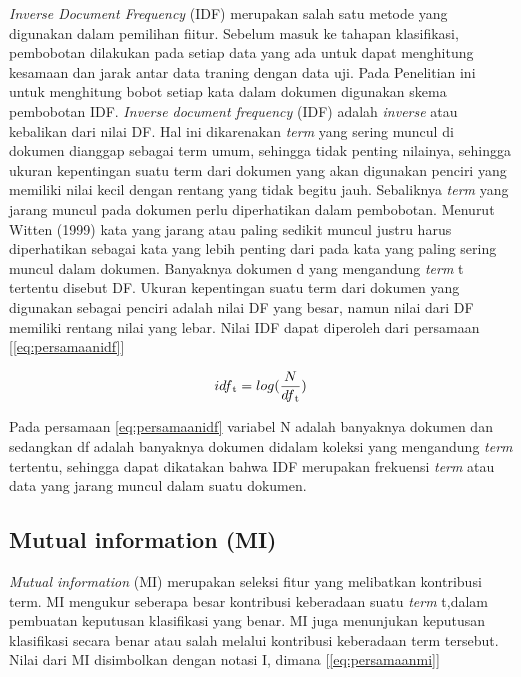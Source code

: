 \textit{Inverse Document Frequency} (IDF) merupakan salah satu metode yang digunakan dalam pemilihan fiitur.  Sebelum masuk ke tahapan klasifikasi, pembobotan dilakukan pada setiap data yang ada untuk dapat menghitung kesamaan dan jarak antar data traning dengan data uji. Pada Penelitian ini untuk menghitung bobot setiap kata dalam dokumen digunakan skema pembobotan IDF. \newline 
\textit{Inverse document frequency} (IDF) adalah \textit{inverse} atau kebalikan dari nilai DF. Hal ini dikarenakan \textit{term} yang sering muncul di dokumen dianggap sebagai term umum, sehingga tidak penting nilainya, sehingga ukuran kepentingan suatu term dari dokumen yang akan digunakan penciri yang memiliki nilai kecil dengan rentang yang tidak begitu jauh. Sebaliknya \textit{term} yang jarang muncul pada dokumen perlu diperhatikan dalam pembobotan. Menurut Witten (1999) kata yang jarang atau paling sedikit muncul justru harus diperhatikan sebagai kata yang lebih penting dari pada kata yang paling sering muncul dalam dokumen. Banyaknya dokumen d yang mengandung \textit{term} t tertentu disebut DF. Ukuran kepentingan suatu term dari dokumen yang digunakan sebagai penciri adalah nilai DF yang besar, namun nilai dari DF memiliki rentang nilai yang lebar. Nilai IDF dapat diperoleh dari persamaan [\ref{eq:persamaanidf}]

\begin{equation}
idf\textsubscript{t} = log(\frac{N}{df\textsubscript{t}})
\end{equation}

Pada persamaan \ref{eq:persamaanidf} variabel N adalah banyaknya dokumen dan sedangkan df adalah banyaknya dokumen didalam koleksi yang mengandung \textit{term} tertentu, sehingga dapat dikatakan bahwa IDF merupakan frekuensi \textit{term} atau data yang jarang muncul dalam suatu dokumen.

\subsection*{Mutual information (MI)}

\textit{Mutual information} (MI) merupakan seleksi fitur yang melibatkan kontribusi term. MI mengukur seberapa besar kontribusi keberadaan suatu \textit{term} t,dalam pembuatan keputusan klasifikasi yang benar. MI juga menunjukan keputusan klasifikasi secara benar atau salah melalui kontribusi keberadaan term tersebut. Nilai dari MI disimbolkan dengan notasi I, dimana [\ref{eq:persamaanmi}]


